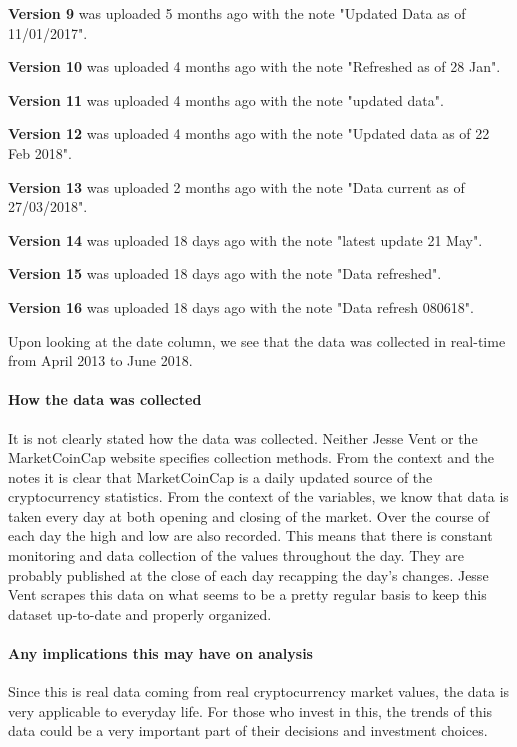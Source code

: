 \documentclass[11pt]{article}
\begin{document}
\textbf{Version 9} was uploaded 5 months ago with the note "Updated Data
as of 11/01/2017".

\textbf{Version 10} was uploaded 4 months ago with the note "Refreshed
as of 28 Jan".

\textbf{Version 11} was uploaded 4 months ago with the note "updated
data".

\textbf{Version 12} was uploaded 4 months ago with the note "Updated
data as of 22 Feb 2018".

\textbf{Version 13} was uploaded 2 months ago with the note "Data
current as of 27/03/2018".

\textbf{Version 14} was uploaded 18 days ago with the note "latest
update 21 May".

\textbf{Version 15} was uploaded 18 days ago with the note "Data
refreshed".

\textbf{Version 16} was uploaded 18 days ago with the note "Data refresh
080618".

Upon looking at the date column, we see that the data was collected in
real-time from April 2013 to June 2018.

    \paragraph{How the data was collected}\label{how-the-data-was-collected}

    It is not clearly stated how the data was collected. Neither Jesse Vent
or the MarketCoinCap website specifies collection methods. From the
context and the notes it is clear that MarketCoinCap is a daily updated
source of the cryptocurrency statistics. From the context of the
variables, we know that data is taken every day at both opening and
closing of the market. Over the course of each day the high and low are
also recorded. This means that there is constant monitoring and data
collection of the values throughout the day. They are probably published
at the close of each day recapping the day's changes. Jesse Vent scrapes
this data on what seems to be a pretty regular basis to keep this
dataset up-to-date and properly organized.

    \paragraph{Any implications this may have on
analysis}\label{any-implications-this-may-have-on-analysis}

    Since this is real data coming from real cryptocurrency market values,
the data is very applicable to everyday life. For those who invest in
this, the trends of this data could be a very important part of their
decisions and investment choices.
\end{document}
